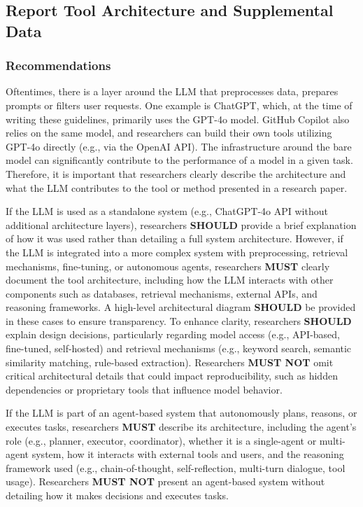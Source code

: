 \documentclass[11pt]{article}
\newcommand{\must}{\textbf{MUST}\xspace}
\newcommand{\mustnot}{\textbf{MUST NOT}\xspace}
\newcommand{\should}{\textbf{SHOULD}\xspace}
\begin{document}
\subsection{Report Tool Architecture and Supplemental Data}

\subsubsection{Recommendations}

Oftentimes, there is a layer around the LLM that preprocesses data, prepares prompts or filters user requests. One example is ChatGPT, which, at the time of writing these guidelines, primarily uses the GPT-4o model. GitHub Copilot also relies on the same model, and researchers can build their own tools utilizing GPT-4o directly (e.g., via the OpenAI API). The infrastructure around the bare model can significantly contribute to the performance of a model in a given task.
Therefore, it is important that researchers clearly describe the architecture and what the LLM contributes to the tool or method presented in a research paper.


If the LLM is used as a standalone system (e.g., ChatGPT-4o API without additional architecture layers), researchers \should provide a brief explanation of how it was used rather than detailing a full system architecture. However, if the LLM is integrated into a more complex system with preprocessing, retrieval mechanisms, fine-tuning, or autonomous agents, researchers \must clearly document the tool architecture, including how the LLM interacts with other components such as databases, retrieval mechanisms, external APIs, and reasoning frameworks. A high-level architectural diagram \should be provided in these cases to ensure transparency. To enhance clarity, researchers \should explain design decisions, particularly regarding model access (e.g., API-based, fine-tuned, self-hosted) and retrieval mechanisms (e.g., keyword search, semantic similarity matching, rule-based extraction). Researchers \mustnot omit critical architectural details that could impact reproducibility, such as hidden dependencies or proprietary tools that influence model behavior.


If the LLM is part of an agent-based system that autonomously plans, reasons, or executes tasks, researchers \must describe its architecture, including the agent's role (e.g., planner, executor, coordinator), whether it is a single-agent or multi-agent system, how it interacts with external tools and users, and the reasoning framework used (e.g., chain-of-thought, self-reflection, multi-turn dialogue, tool usage). Researchers \mustnot present an agent-based system without detailing how it makes decisions and executes tasks.
\end{document}
